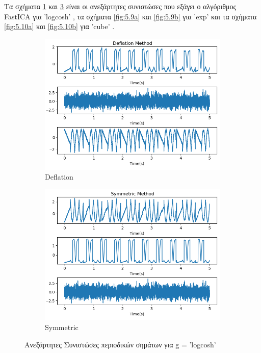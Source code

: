 \noindent Τα σχήματα \en \ref{fig:5.8a} \gr και \en \ref{fig:5.8b} \gr είναι οι ανεξάρτητες συνιστώσες που εξάγει ο αλγόριθμος \en FastICA \gr για \en 'logcosh' \gr, τα σχήματα \en \ref{fig:5.9a} \gr   και \en \ref{fig:5.9b} \gr  για \en 'exp' \gr και τα σχήματα \en \ref{fig:5.10a} \gr και \en \ref{fig:5.10b} \gr για \en 'cube' \gr.
\begin{figure}[H]
    \centering
    \begin{subfigure}{0.48 \textwidth}
        \centering
       \includegraphics[width=\textwidth]{fwto/logcosh_def.png} \en
        \caption{Deflation} \gr
        \label{fig:5.8a}
    \end{subfigure}
    \hfill
    \begin{subfigure}{0.48 \textwidth}
        \centering
       \includegraphics[width=\textwidth]{fwto/logcosh_sym.png} \en
        \en
        \caption{Symmetric} \gr
        \label{fig:5.8b}
    \end{subfigure}
    \gr
    \caption{Ανεξάρτητες Συνιστώσες περιοδικών σημάτων για \en g = 'logcosh' \gr}
\end{figure}

